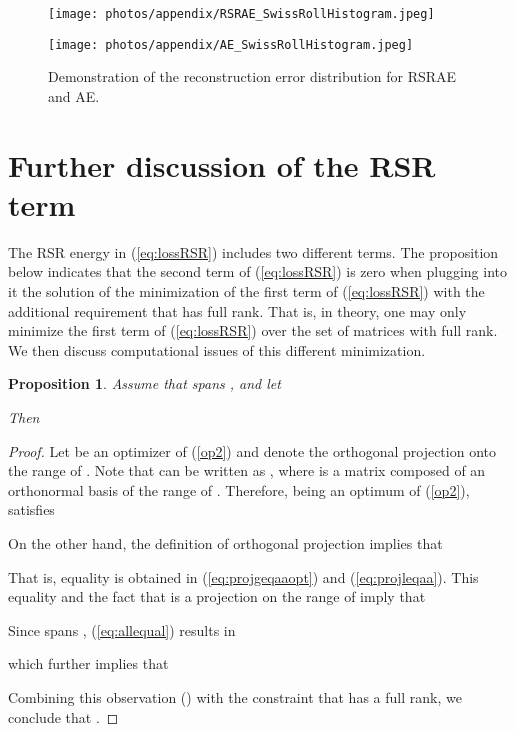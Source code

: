 \documentclass{article} \usepackage{iclr2020_conference,times}
\def\eqref#1{(\ref{#1})}
\newtheorem{proposition}{Proposition}[section]
\begin{document}
\begin{figure}[htbp]
\centering
\begin{minipage}[t]{0.48\textwidth}
\centering
\texttt{[image: photos/appendix/RSRAE\_SwissRollHistogram.jpeg]}
\label{fig:RSRAE_hist}

\end{minipage}
\begin{minipage}[t]{0.48\textwidth}
\centering
\texttt{[image: photos/appendix/AE\_SwissRollHistogram.jpeg]}
\label{fig:AE_hist}
\end{minipage}
\caption{{Demonstration of the reconstruction error distribution for RSRAE and AE.}}
\label{fig:histograms}
\end{figure}



\newpage

\section{Further discussion of the RSR term}
\label{sec:more_RSR_term}

The RSR energy in \eqref{eq:lossRSR} includes two different terms. 
The proposition below indicates that the second term of \eqref{eq:lossRSR} is zero when plugging into it the solution of the minimization of the first term of \eqref{eq:lossRSR} with the additional requirement that  has full rank. That is, in theory, one may only minimize the first term of \eqref{eq:lossRSR} over the set of matrices  with full rank. We then discuss computational issues of this different minimization.

\begin{proposition}\label{prop:noneedboth}
Assume that  spans ,  and let

Then 
\end{proposition}


\begin{proof}

Let  be an optimizer of \eqref{op2} and  denote the orthogonal projection onto the range of . Note that  can be written as , where  is a  matrix composed of an orthonormal basis of the range of . Therefore, being an optimum of \eqref{op2},  satisfies

On the other hand, the definition of orthogonal projection implies that

That is, equality is obtained in \eqref{eq:projgeqaaopt} and \eqref{eq:projleqaa}. This equality and the fact that  is a projection on the range of  imply that  

Since  spans , \eqref{eq:allequal} results in

which further implies that 

Combining this observation () with the constraint that  has a full rank, we conclude that .

\end{proof}
\end{document}
